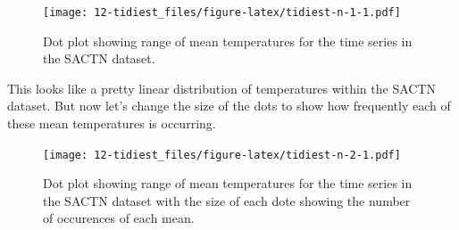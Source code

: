 \documentclass[]{book}
\newenvironment{Shaded}{\begin{snugshade}}{\end{snugshade}}
\newcommand{\KeywordTok}[1]{\textcolor[rgb]{0.13,0.29,0.53}{\textbf{#1}}}
\newcommand{\DataTypeTok}[1]{\textcolor[rgb]{0.13,0.29,0.53}{#1}}
\newcommand{\DecValTok}[1]{\textcolor[rgb]{0.00,0.00,0.81}{#1}}
\newcommand{\StringTok}[1]{\textcolor[rgb]{0.31,0.60,0.02}{#1}}
\newcommand{\OperatorTok}[1]{\textcolor[rgb]{0.81,0.36,0.00}{\textbf{#1}}}
\newcommand{\NormalTok}[1]{#1}
\theoremstyle{definition}
\theoremstyle{definition}
\theoremstyle{definition}
\theoremstyle{remark}
\begin{document}
\begin{figure}
\centering
\texttt{[image: 12-tidiest\_files/figure-latex/tidiest-n-1-1.pdf]}
\caption{\label{fig:tidiest-n-1}Dot plot showing range of mean temperatures
for the time series in the SACTN dataset.}
\end{figure}

This looks like a pretty linear distribution of temperatures within the
SACTN dataset. But now let's change the size of the dots to show how
frequently each of these mean temperatures is occurring.

\begin{Shaded}
\end{Shaded}

\begin{figure}
\centering
\texttt{[image: 12-tidiest\_files/figure-latex/tidiest-n-2-1.pdf]}
\caption{\label{fig:tidiest-n-2}Dot plot showing range of mean temperatures
for the time series in the SACTN dataset with the size of each dote
showing the number of occurences of each mean.}
\end{figure}
\end{document}
